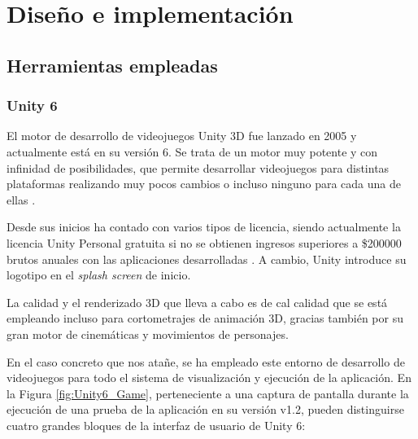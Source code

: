 \chapter{Diseño e implementación}
\label{chap:diseno}



\section{Herramientas empleadas}
\label{sec:HerramientasEmpleadas}


\subsection{Unity 6}
\label{subsec:Unity6}

El motor de desarrollo de videojuegos Unity 3D fue lanzado en 2005 y actualmente está en su versión 6. Se trata de un motor muy potente y con infinidad de posibilidades, que permite desarrollar videojuegos para distintas plataformas realizando muy pocos cambios o incluso ninguno para cada una de ellas \cite{Unity6}. 


Desde sus inicios ha contado con varios tipos de licencia, siendo actualmente la licencia Unity Personal gratuita si no se obtienen ingresos superiores a \$\SI{200000}{} brutos anuales con las aplicaciones desarrolladas . A cambio, Unity introduce su logotipo en el \textit{splash screen} de inicio.

La calidad y el renderizado 3D que lleva a cabo es de cal calidad que se está empleando incluso para cortometrajes de animación 3D, gracias también por su gran motor de cinemáticas y movimientos de personajes.

En el caso concreto que nos atañe, se ha empleado este entorno de desarrollo de videojuegos para todo el sistema de visualización y ejecución de la aplicación. En la Figura \ref{fig:Unity6_Game}, perteneciente a una captura de pantalla durante la ejecución de una prueba de la aplicación en su versión v1.2, pueden distinguirse cuatro grandes bloques de la interfaz de usuario de Unity 6:

